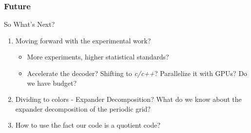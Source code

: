 \documentclass{beamer}
\begin{document}
\begin{frame}
  \frametitle{Future}
 \begin{block}{So What's Next?}
   \begin{enumerate}
     \item<+-> Moving forward with the experimental work? 
       \begin{itemize}
         \item More experiments, higher statistical standards?
         \item Accelerate the decoder? Shifting to \textit{c/c++}? Parallelize it with GPUs? Do we have budget? 
       \end{itemize}
     \item<+-> Dividing to colors - Expander Decomposition? What do we know about the expander decomposition of the periodic grid? 
     \item<+-> How to use the fact our code is a quotient code? 
   \end{enumerate}
 \end{block}
\end{frame}
\end{document}
